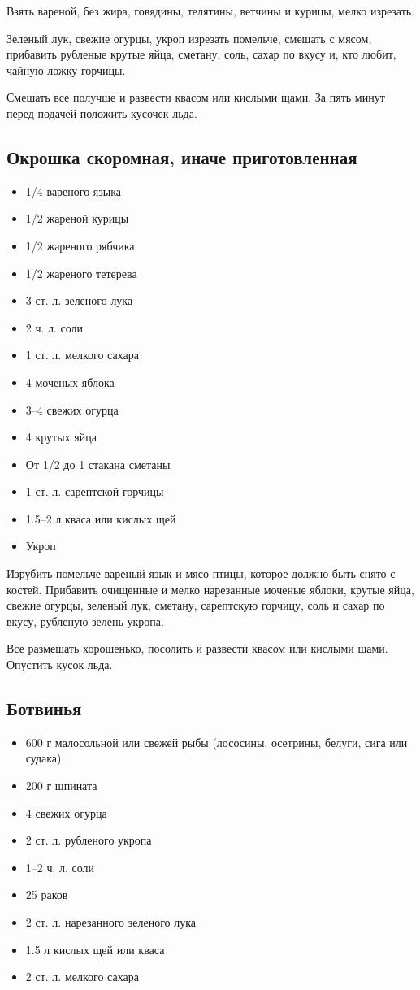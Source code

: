 Взять вареной, без жира, говядины, телятины, ветчины и курицы, мелко изрезать.

Зеленый лук, свежие огурцы, укроп изрезать помельче, смешать с мясом, прибавить рубленые крутые яйца, сметану, соль, сахар по вкусу и, кто любит, чайную ложку горчицы.

Смешать все получше и развести квасом или кислыми щами. За пять минут перед подачей положить кусочек льда.

\subsection{Окрошка скоромная, иначе приготовленная}

\begin{itemize}
	\item 1/4 вареного языка 
    \item 1/2 жареной курицы 
    \item 1/2 жареного рябчика 
    \item 1/2 жареного тетерева
    \item 3 ст. л. зеленого лука
    \item 2 ч. л. соли 
    \item 1 ст. л. мелкого сахара 
    \item 4 моченых яблока
    \item 3–4 свежих огурца 
    \item 4 крутых яйца
    \item От 1/2 до 1 стакана сметаны
    \item 1 ст. л. сарептской горчицы 
    \item 1.5–2 л кваса или кислых щей
    \item Укроп
\end{itemize}

Изрубить помельче вареный язык и мясо птицы, которое должно быть снято с костей. Прибавить очищенные и мелко нарезанные моченые яблоки, крутые яйца, свежие огурцы, зеленый лук, сметану, сарептскую горчицу, соль и сахар по вкусу, рубленую зелень укропа.

Все размешать хорошенько, посолить и развести квасом или кислыми щами. Опустить кусок льда.

\subsection{Ботвинья}

\begin{itemize}
	\item 600 г малосольной или свежей рыбы (лососины, осетрины, белуги, сига или судака)
    \item 200 г шпината
    \item 4 свежих огурца 
    \item 2 ст. л. рубленого укропа 
    \item 1–2 ч. л. соли 
    \item 25 раков
    \item 2 ст. л. нарезанного зеленого лука 
    \item 1.5 л кислых щей или кваса 
    \item 2 ст. л. мелкого сахара
\end{itemize}

